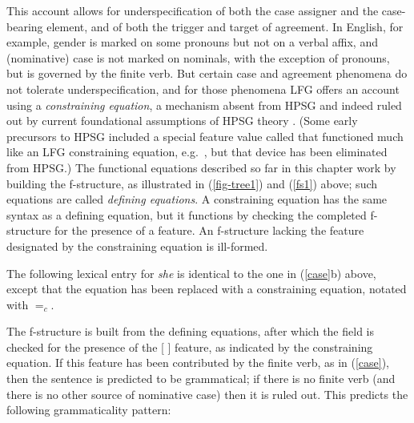 This account allows for underspecification of both the case assigner and the case-bearing element,
and of both the trigger and target of agreement.   In  English, for example, gender is marked on
some pronouns but not on a verbal affix, and (nominative) case is not marked on   nominals, with the
exception of  pronouns, but is governed by the finite verb.  But certain case and agreement
phenomena do not tolerate underspecification, and for those phenomena LFG offers an account using a
\textit{constraining equation}, a mechanism absent from HPSG and indeed ruled out by current
foundational assumptions of HPSG theory .  (Some early precursors to HPSG included a special feature value called  that functioned much like an LFG constraining equation, e.g.\ \citealt[36--37]{Shieber86a}, but that device has been eliminated from HPSG.)  The functional equations described so far in this chapter work by building the f-structure, as illustrated in (\ref{fig-tree1}) and (\ref{fs1}) above; such equations are called \textit{defining equations}.  A constraining equation has the same syntax as a defining equation, but it functions by checking the completed f-structure for the presence of a feature.  An f-structure lacking the feature designated by the constraining equation is ill-formed.  

The following lexical entry for \textit{she} is identical to the one in (\ref{case}b) above, except that the  equation has been replaced with a constraining equation, notated with $=_c$.  

\ea
\label{constrain}
{\qquad{} }
\z
The f-structure is built from the defining equations, after which the \subj{} field is checked for the presence of the [ ] feature, as indicated by the constraining equation.  If this feature has been contributed by the finite verb, as in (\ref{case}), then the sentence is predicted to be grammatical; if there is no finite verb (and there is no other source of nominative case) then it is ruled out.  This predicts the following grammaticality pattern:


